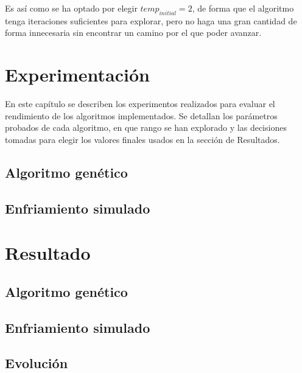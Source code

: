 \documentclass[11pt,spanish,listoffigures,listoftables]{tfgetsinf}
\begin{document}
Es así como se ha optado por elegir $temp_{initial} = 2$, de forma que el algoritmo tenga iteraciones suficientes para explorar, pero no haga una gran cantidad de forma innecesaria sin encontrar un camino por el que poder avanzar.

\chapter{Experimentación}
En este capítulo se describen los experimentos realizados para evaluar el rendimiento de los algoritmos implementados. Se detallan los parámetros probados de cada algoritmo, en que rango se han explorado y las decisiones tomadas para elegir los valores finales usados en la sección de Resultados.

\section{Algoritmo genético}

\section{Enfriamiento simulado}


\chapter{Resultado}

\section{Algoritmo genético}

\section{Enfriamiento simulado}

\section{Evolución}
\end{document}
